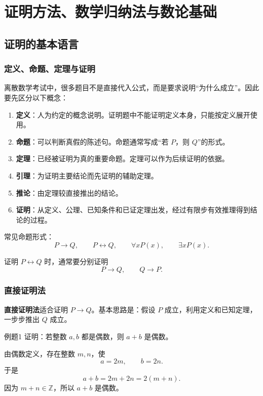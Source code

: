\section{证明方法、数学归纳法与数论基础}

\subsection{证明的基本语言}

\subsubsection{定义、命题、定理与证明}

离散数学考试中，很多题目不是直接代入公式，而是要求说明“为什么成立”。因此要先区分以下概念：
\begin{enumerate}
	\item \textbf{定义}：人为约定的概念说明。证明题中不能证明定义本身，只能按定义展开使用。
	\item \textbf{命题}：可以判断真假的陈述句。命题通常写成“若 \(P\)，则 \(Q\)”的形式。
	\item \textbf{定理}：已经被证明为真的重要命题。定理可以作为后续证明的依据。
	\item \textbf{引理}：为证明主要结论而先证明的辅助定理。
	\item \textbf{推论}：由定理较直接推出的结论。
	\item \textbf{证明}：从定义、公理、已知条件和已证定理出发，经过有限步有效推理得到结论的过程。
\end{enumerate}

常见命题形式：
\[
P\to Q,\qquad P\leftrightarrow Q,\qquad \forall x P(x),\qquad \exists x P(x).
\]

证明 \(P\leftrightarrow Q\) 时，通常要分别证明
\[
P\to Q,\qquad Q\to P.
\]

\subsubsection{直接证明法}

\textbf{直接证明法}适合证明 \(P\to Q\)。基本思路是：假设 \(P\) 成立，利用定义和已知定理，一步步推出 \(Q\) 成立。

\begin{question}{例题1}
	证明：若整数 \(a,b\) 都是偶数，则 \(a+b\) 是偶数。
	
	\begin{solution}
	由偶数定义，存在整数 \(m,n\)，使
	\[
	a=2m,\qquad b=2n.
	\]
	于是
	\[
	a+b=2m+2n=2(m+n).
	\]
	因为 \(m+n\in\mathbb Z\)，所以 \(a+b\) 是偶数。
	\end{solution}
\end{question}

